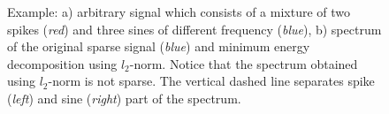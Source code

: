 \documentclass[journal]{IEEEtran}
\begin{document}
\begin{figure}
	\centering
	
	\caption{Example: a) arbitrary signal which consists of a mixture of two spikes (\textit{red}) and three sines of different frequency (\textit{blue}), b) spectrum of the original sparse signal (\textit{blue}) and minimum energy decomposition using $l_2$-norm. Notice that the spectrum obtained using $l_2$-norm is not sparse. The vertical dashed line separates spike (\textit{left}) and sine (\textit{right}) part of the spectrum.}
	
	\label{fig:example_signal_spectrum}
\end{figure}
\end{document}
